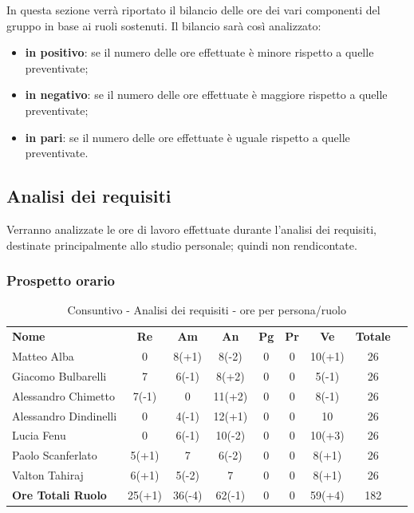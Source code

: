
In questa sezione verrà riportato il bilancio delle ore dei vari componenti del gruppo in base ai ruoli sostenuti. Il bilancio sarà così analizzato:
\begin{itemize}
	\item {\bfseries in positivo}: se il numero delle ore effettuate è minore rispetto a quelle preventivate;
	\item {\bfseries in negativo}: se il numero delle ore effettuate è maggiore rispetto a quelle preventivate;
	\item {\bfseries in pari}: se il numero delle ore effettuate è uguale rispetto a quelle preventivate. \\
\end{itemize}

\subsection {Analisi dei requisiti}
Verranno analizzate le ore di lavoro effettuate durante l'analisi dei requisiti, destinate principalmente allo studio personale; quindi non rendicontate.
\subsubsection{Prospetto orario}
	\begin{table} [h!]
	\begin{center}
		\begin{tabular} { m{6 cm} c c c c c c c c }
			\rowcolor{lightgray}
			\textbf{Nome} & \textbf{Re} & \textbf{Am} & \textbf{An} & \textbf{Pg} &\textbf{Pr} & \textbf{Ve} & \textbf{Totale} \\ 
			Matteo Alba & 0 & 8(+1) &8(-2) & 0 & 0 & 10(+1) & 26  \\ 
			Giacomo Bulbarelli & 7 & 6(-1) & 8(+2) & 0 & 0 & 5(-1) & 26 \\ 
			Alessandro Chimetto & 7(-1) & 0 & 11(+2) & 0 & 0 & 8(-1) & 26 \\
			Alessandro Dindinelli & 0 & 4(-1) & 12(+1) & 0 & 0 & 10 & 26 \\
			Lucia Fenu & 0 & 6(-1) & 10(-2) & 0 & 0 & 10(+3) & 26 \\
			Paolo Scanferlato & 5(+1) & 7 & 6(-2) & 0 & 0 & 8(+1) & 26 \\
			Valton Tahiraj & 6(+1) & 5(-2) &7 & 0 & 0 & 8(+1) & 26 \\
			\textbf{Ore Totali Ruolo} & 25(+1) & 36(-4) & 62(-1) & 0 & 0 & 59(+4) & 182\\
		
		\end{tabular}
		\caption{Consuntivo - Analisi dei requisiti - ore per persona/ruolo}
	\end{center}
\end{table}


